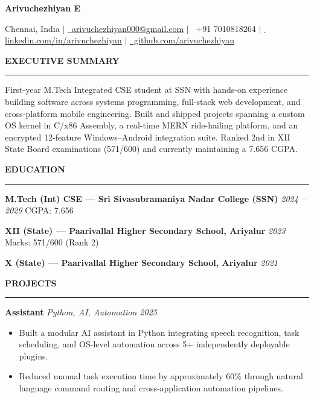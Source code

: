 \documentclass[11pt]{article}
\newcommand{\name}[1]{{\fontsize{24pt}{24pt}\selectfont\textbf{#1}}}
\newcommand{\sectionhead}[1]{{\color{darkblue}\fontsize{12pt}{12pt}\selectfont\textbf{#1}}\vspace{4pt}\hrule\vspace{6pt}}
\newcommand{\subsectionhead}[2]{{\textbf{#1}} \hfill {\textit{#2}}\vspace{2pt}}
\begin{document}
\begin{center}
    \name{Arivuchezhiyan E}
    \vspace{3pt}
    
    Chennai, India $|$ \href{mailto:arivuchezhiyan000@gmail.com}{\faEnvelope \, arivuchezhiyan000@gmail.com} $|$ \faPhone \, +91 7010818264 $|$ 
    \href{https://linkedin.com/in/arivuchezhiyan}{\faLinkedin \, linkedin.com/in/arivuchezhiyan} $|$ 
    \href{https://github.com/arivuchezhiyan}{\faGithub \, github.com/arivuchezhiyan}
\end{center}

\vspace{6pt}

\sectionhead{EXECUTIVE SUMMARY}

First-year M.Tech Integrated CSE student at SSN with hands-on experience building software across systems programming, full-stack web development, and cross-platform mobile engineering. Built and shipped projects spanning a custom OS kernel in C/x86 Assembly, a real-time MERN ride-hailing platform, and an encrypted 12-feature Windows–Android integration suite. Ranked 2nd in XII State Board examinations (571/600) and currently maintaining a 7.656 CGPA.

\vspace{6pt}

\sectionhead{EDUCATION}

\subsectionhead{M.Tech (Int) CSE — Sri Sivasubramaniya Nadar College (SSN)}{2024 – 2029}
CGPA: 7.656

\subsectionhead{XII (State) — Paarivallal Higher Secondary School, Ariyalur}{2023}
Marks: 571/600 (Rank 2)

\subsectionhead{X (State) — Paarivallal Higher Secondary School, Ariyalur}{2021}

\vspace{6pt}

\sectionhead{PROJECTS}

\subsectionhead{Assistant}{Python, AI, Automation \hfill 2025}
\begin{itemize}
    \item Built a modular AI assistant in Python integrating speech recognition, task scheduling, and OS-level automation across 5+ independently deployable plugins.
    \item Reduced manual task execution time by approximately 60\% through natural language command routing and cross-application automation pipelines.
\end{itemize}
\end{document}
